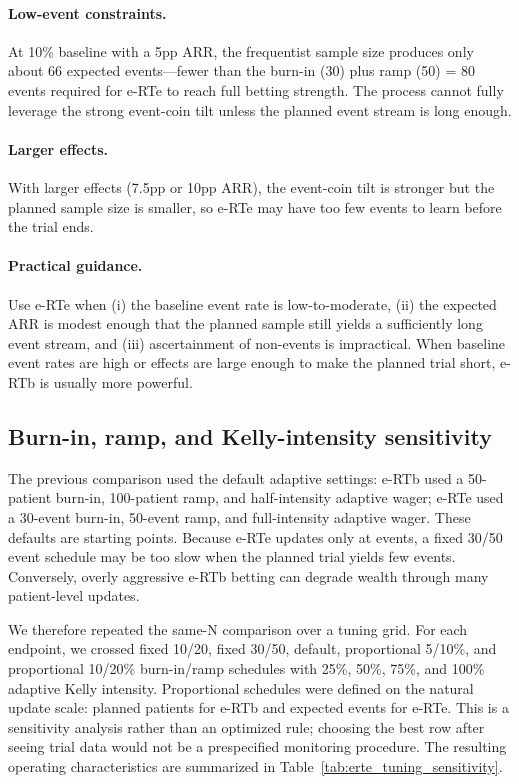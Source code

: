 \documentclass[10pt]{article}
\begin{document}
\paragraph{Low-event constraints.} At 10\% baseline with a 5pp ARR, the frequentist sample size produces only about 66 expected events---fewer than the burn-in (30) plus ramp (50) = 80 events required for e-RTe to reach full betting strength. The process cannot fully leverage the strong event-coin tilt unless the planned event stream is long enough.

\paragraph{Larger effects.} With larger effects (7.5pp or 10pp ARR), the event-coin tilt is stronger but the planned sample size is smaller, so e-RTe may have too few events to learn before the trial ends.

\paragraph{Practical guidance.} Use e-RTe when (i) the baseline event rate is low-to-moderate, (ii) the expected ARR is modest enough that the planned sample still yields a sufficiently long event stream, and (iii) ascertainment of non-events is impractical. When baseline event rates are high or effects are large enough to make the planned trial short, e-RTb is usually more powerful.

\subsection{Burn-in, ramp, and Kelly-intensity sensitivity}

The previous comparison used the default adaptive settings: e-RTb used a 50-patient burn-in, 100-patient ramp, and half-intensity adaptive wager; e-RTe used a 30-event burn-in, 50-event ramp, and full-intensity adaptive wager. These defaults are starting points. Because e-RTe updates only at events, a fixed 30/50 event schedule may be too slow when the planned trial yields few events. Conversely, overly aggressive e-RTb betting can degrade wealth through many patient-level updates.

We therefore repeated the same-N comparison over a tuning grid. For each endpoint, we crossed fixed 10/20, fixed 30/50, default, proportional 5/10\%, and proportional 10/20\% burn-in/ramp schedules with 25\%, 50\%, 75\%, and 100\% adaptive Kelly intensity. Proportional schedules were defined on the natural update scale: planned patients for e-RTb and expected events for e-RTe. This is a sensitivity analysis rather than an optimized rule; choosing the best row after seeing trial data would not be a prespecified monitoring procedure. The resulting operating characteristics are summarized in Table~\ref{tab:erte_tuning_sensitivity}.
\end{document}
